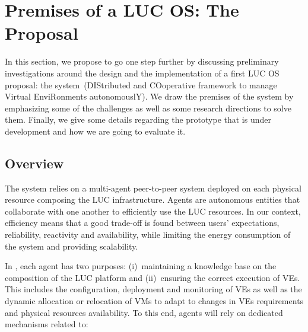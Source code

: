 \section{Premises of a LUC OS: The \discovery Proposal\label{sec:archi}}

In this section, we propose to go one step further by discussing preliminary
investigations around the design and the implementation of a first LUC OS
proposal: the \discovery system~(DIStributed and COoperative framework to manage
Virtual EnviRonments autonomouslY). We draw the premises of the \discovery
system by emphasizing some of the challenges as well as some research directions
to solve them. Finally, we give some details regarding the prototype that is
under development and how we are going to evaluate it.  

\vspace*{-.4cm}
\subsection{Overview}

The \discovery system relies on a multi-agent peer-to-peer system deployed on
each physical resource composing the LUC infrastructure. Agents are autonomous
entities that collaborate with one another to efficiently use the LUC resources. In our context,
efficiency means that a good trade-off is found between users'
expectations, reliability, reactivity and availability,
while limiting the energy consumption of the system and providing
scalability. 

In \discovery, each agent has two purposes: (i)~maintaining a knowledge base on the
composition of the LUC platform and (ii)~ensuring the correct execution of VEs. 
This includes the configuration, deployment and monitoring of
VEs as well as the dynamic allocation or relocation of VMs to adapt to changes
in VEs requirements and physical resources availability. To this end, agents
will rely on dedicated mechanisms related to: 

